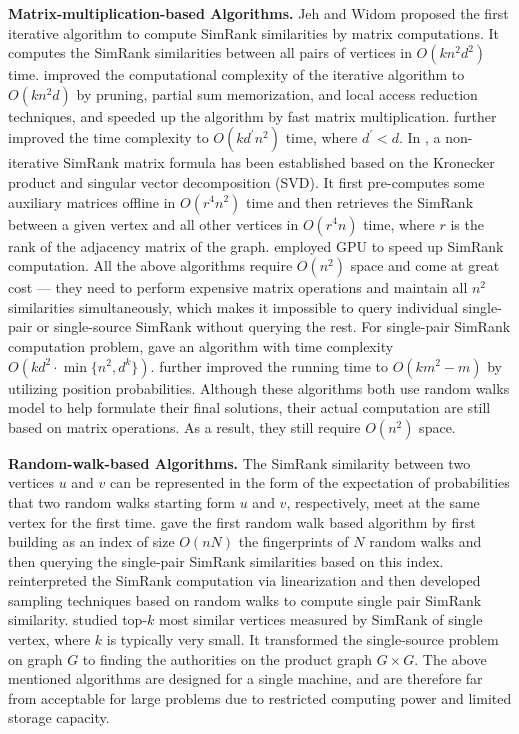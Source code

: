 \documentclass[conference]{IEEEtran}
\theoremstyle{definition}
\theoremstyle{definition}
\begin{document}
\textbf{Matrix-multiplication-based Algorithms. } Jeh and Widom \cite{jeh2002simrank} proposed the first iterative algorithm to compute SimRank similarities by matrix computations.
 It computes the SimRank similarities between all pairs of vertices in $O(kn^2d^2)$ time.
 \cite{lizorkin2008accuracy} improved the computational complexity of the iterative algorithm to $O(kn^2d)$ by pruning, partial sum memorization, and local access reduction techniques, and \cite{yu2012space} speeded up the algorithm by fast matrix multiplication.
\cite{yu2013towards} further improved the time complexity to $O(kd^{\prime}n^2)$ time, where $d^\prime < d$.
 In \cite{li2010fast1}, a non-iterative SimRank matrix formula has been established based on the Kronecker product and singular vector decomposition (SVD).
 It first pre-computes some auxiliary matrices offline in $O(r^4n^2)$ time and then retrieves the SimRank between a given vertex and all other vertices in $O(r^4n)$ time, where $r$ is the rank of the adjacency matrix of the graph.
 \cite{he2010parallel} employed GPU to speed up SimRank computation. 
All the above algorithms require $O(n^2)$ space and come at great cost --- they need to perform expensive matrix operations and maintain all $n^2$ similarities simultaneously, which makes it impossible to query individual single-pair or  single-source  SimRank without querying the rest.
For single-pair SimRank computation problem, \cite{li2010fast} gave an algorithm with time complexity $O(kd^2\cdot \min{\{n^2, d^k\}})$. 
\cite{he2014assessing} further improved the running time to $O(km^2 - m)$ by utilizing position probabilities. 
Although these  algorithms both use random walks model to help formulate their final solutions, their actual computation are still based on matrix operations. As a result, they still require $O(n^2)$ space. 
 
 \textbf{Random-walk-based Algorithms. } 
The SimRank similarity between two vertices $u$ and $v$ can be represented in the form of the expectation of probabilities that two random walks starting form $u$ and $v$, respectively, meet at the same vertex for the first time. 
\cite{fogaras2005scaling} gave the first random walk based algorithm by first building as an index of size $O(nN)$ the fingerprints of $N$ random walks and then querying the single-pair SimRank similarities based on this index. 
\cite{kusumoto2014scalable} reinterpreted the SimRank computation via linearization and then developed sampling techniques based on random walks to compute single pair SimRank similarity. 
\cite{lee2012top} studied top-$k$ most similar vertices measured by SimRank of single vertex, where $k$ is typically very small.  It transformed the single-source problem on graph $G$ to finding the authorities on the product graph $G\times G$.
The above mentioned algorithms are designed for a single machine, and are therefore far from acceptable for large problems due to restricted computing power and limited storage capacity. 
\end{document}
